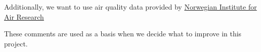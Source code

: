 Additionally, we want to use air quality data provided by \href{http://luftkvalitet.info}{Norwegian Institute for Air Research} 

These comments are used as a basis when we decide what to improve in this project. 







